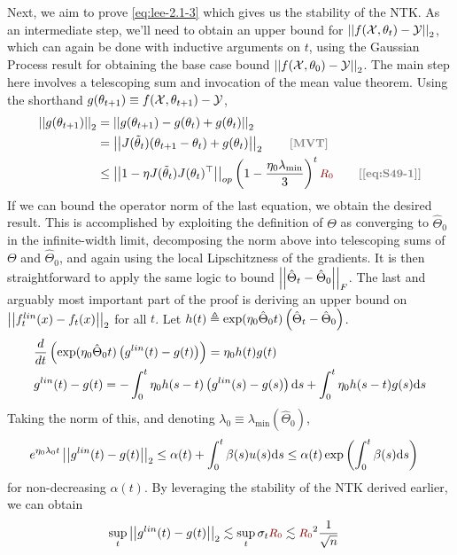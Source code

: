 \documentclass{article}
\begin{document}
Next, we aim to prove \ref{eq:lee-2.1-3} which gives us the stability of the NTK. As an intermediate step, we'll need to obtain an upper bound for $\norm{\g}$, which can again be done with inductive arguments on $t$, using the Gaussian Process result for obtaining the base case bound $\norm{\g[0]}$. The main step here involves a telescoping sum and invocation of the mean value theorem. Using the shorthand $g(\theta_{t+1}) \equiv \g[t+1]$,
\begin{align}
	\norm{g(\theta_{t+1})} 	
		&= \norm{g(\theta_{t+1}) - g(\theta_t) + g(\theta_t)} \\
		&= \norm{J(\tilde\theta_t) (\theta_{t+1} - \theta_t) + g(\theta_t)} 
		\qquad \mtgray{[MVT]} \\
		&\leq \norm[op]{1 - \eta J(\tilde\theta_t) J(\theta_t)^\top} \lr{1 - \frac{\eta_0 \lambda_{\text{min}}}{3}}^t \r 
		\qquad \mtgray{[\ref{eq:S49-1}]}
\end{align}
If we can bound the operator norm of the last equation, we obtain the desired result. This is accomplished by exploiting the definition of $\Theta$ as converging to $\hat\Theta_0$ in the infinite-width limit, decomposing the norm above into telescoping sums of $\Theta$ and $\hat\Theta_0$, and again using the local Lipschitzness of the gradients. It is then straightforward to apply the same logic to bound $\norm[F]{\hat\Theta_t - \hat\Theta_0}$. The last and arguably most important part of the proof is deriving an upper bound on $\norm{f^{lin}_t(x) - f_t(x)}$ for all $t$. Let $h(t) \triangleq \exp(\eta_0 \hat\Theta_0t) \lr{\hat\Theta_t - \hat\Theta_0}$.
\begin{align}
	&\deriv{}{t} \lr{\exp(\eta_0\hat\Theta_0 t) \lr{ g^{lin}(t) - g(t) }  }
		= \eta_0 h(t) g(t) \label{eq:yo} \\
	&g^{lin}(t) - g(t)
		= - \int_0^t \eta_0 h(s - t) \lr{ g^{lin}(s) - g(s) } \mathrm{d}s
			+  \int_0^t \eta_0 h(s - t)   g(s)  \mathrm{d}s
\end{align}
Taking the norm of this, and denoting $\lambda_0 \equiv \lambda_{\text{min}}(\hat\Theta_0)$,
\begin{align}
	e^{\eta_0 \lambda_0 t} \norm{g^{lin}(t) - g(t)}
		&\leq \alpha(t) + \int_{0}^t \beta(s) u(s) \mathrm{d}s 
		\leq \alpha(t) \exp\lr{ \int_0^t \beta(s) \mathrm{d}s }
\end{align}
for non-decreasing $\alpha(t)$. By leveraging the stability of the NTK derived earlier, we can obtain
\begin{align}
	\sup_t \norm{g^{lin}(t) - g(t) } 
		&\lesssim \sup_t \sigma_t \r \lesssim \r^2 \inv{\sqrt n}
\end{align}
\end{document}
